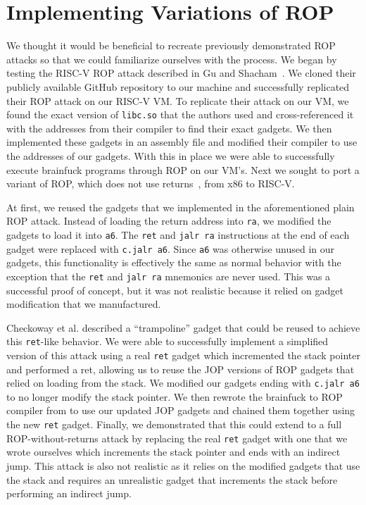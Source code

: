 
\section{Implementing Variations of ROP}

We thought it would be beneficial to recreate previously demonstrated ROP attacks
so that we could familiarize ourselves with the process. We began by testing the
RISC-V ROP attack described in Gu and Shacham~\cite{gu20ropriscv}. We cloned
their publicly available GitHub repository to our machine and successfully
replicated their ROP attack on our RISC-V VM. To replicate their attack on our VM, we
found the exact version of \verb|libc.so| that the authors used and cross-referenced
it with the addresses from their compiler to find their exact gadgets. We then
implemented these gadgets in an assembly file and modified their compiler to use
the addresses of our gadgets. With this in place we were able to successfully execute
brainfuck programs through ROP on our VM's. Next we sought to port a variant of
ROP, which does not use returns~\cite{checkoway10ropnoret}, from x86 to RISC-V.

At first, we reused the gadgets that we implemented in the aforementioned plain ROP
attack. Instead of loading the return address into \verb|ra|, we modified the
gadgets to load it into \verb|a6|. The \verb|ret| and \verb|jalr ra|
instructions at the end of each gadget were replaced with \verb|c.jalr a6|.
Since \verb|a6| was otherwise unused in our gadgets, this functionality is
effectively the same as normal behavior with the exception that the \verb|ret|
and \verb|jalr ra| mnemonics are never used. This was a successful proof of
concept, but it was not realistic because it relied on gadget modification that
we manufactured.

Checkoway et al. described a ``trampoline'' gadget that could be reused to
achieve this \verb|ret|-like behavior. We were able to successfully implement
a simplified version of this attack using a real \verb|ret| gadget which incremented
the stack pointer and performed a ret, allowing us to reuse the JOP versions of ROP gadgets that
relied on loading from the stack. We modified our gadgets ending with \verb|c.jalr a6|
to no longer modify the stack pointer. We then rewrote the brainfuck to ROP compiler
from \cite{gu20ropriscv} to use our updated JOP gadgets and chained them together
using the new \verb|ret| gadget. Finally, we demonstrated that this could extend to a
full ROP-without-returns attack by replacing the real \verb|ret| gadget with one
that we wrote ourselves which increments the stack pointer and ends with an indirect jump.
This attack is also not realistic as it relies on the modified gadgets that use the stack
and requires an unrealistic gadget that increments the stack before performing an indirect jump.

